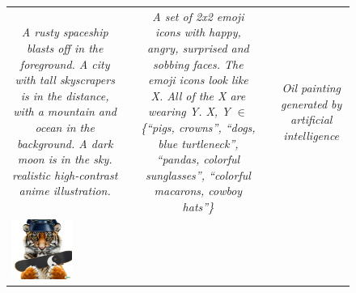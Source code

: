 \begin{figure}[ht!]
\begin{adjustwidth}{-0.8in}{-0.5in}
\begin{tabular}{cccccccccccccccccccc}
\multicolumn{6}{p{\thirdcolwidth\textwidth}}{\textit{\tiny A rusty spaceship blasts off in the foreground. A city with tall skyscrapers is in the distance, with a mountain and ocean in the background. A dark moon is in the sky. realistic high-contrast anime illustration.}} &&
\multicolumn{6}{p{\thirdcolwidth\textwidth}}{\textit{\tiny A set of 2x2 emoji icons with happy, angry, surprised and sobbing faces. The emoji icons look like X. All of the X are wearing Y. \textit{X, Y} $\in$ \{\textit{``pigs, crowns'', ``dogs, blue turtleneck'', ``pandas, colorful sunglasses'', ``colorful macarons, cowboy hats''}\}}} && 
\multicolumn{6}{C{\thirdcolwidth\textwidth}}{\textit{\tiny Oil painting generated by artificial intelligence}} \\

\multicolumn{2}{c}{\includegraphics[width=\threebythreecolwidth\textwidth]{figures/cherries/tiger1.jpg}} &

\end{tabular}
\end{adjustwidth}
\end{figure}
